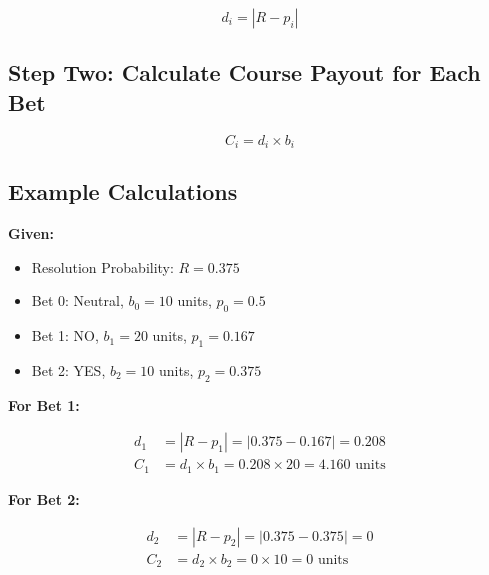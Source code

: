 \documentclass{article}
\begin{document}
\[
d_i = |R - p_i|
\]

\subsection*{Step Two: Calculate Course Payout for Each Bet}

\[
C_i = d_i \times b_i
\]

\subsection*{Example Calculations}

\textbf{Given:}

\begin{itemize}
  \item Resolution Probability: \( R = 0.375 \)
  \item Bet 0: Neutral, \( b_0 = 10 \) units, \( p_0 = 0.5 \)
  \item Bet 1: NO, \( b_1 = 20 \) units, \( p_1 = 0.167 \)
  \item Bet 2: YES, \( b_2 = 10 \) units, \( p_2 = 0.375 \)
\end{itemize}

\textbf{For Bet 1:}

\begin{align*}
d_1 &= |R - p_1| = |0.375 - 0.167| = 0.208 \\
C_1 &= d_1 \times b_1 = 0.208 \times 20 = 4.160 \text{ units}
\end{align*}

\textbf{For Bet 2:}

\begin{align*}
d_2 &= |R - p_2| = |0.375 - 0.375| = 0 \\
C_2 &= d_2 \times b_2 = 0 \times 10 = 0 \text{ units}
\end{align*}

\end{document}
